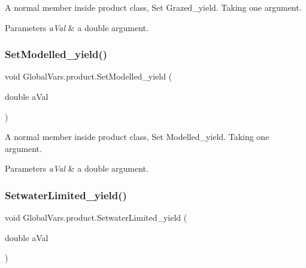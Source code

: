 A normal member inside product class, Set Grazed\+\_\+yield. Taking one argument. 


\begin{DoxyParams}{Parameters}
{\em a\+Val} & a double argument. \\
\hline
\end{DoxyParams}
\mbox{\label{class_global_vars_1_1product_a717c1a27b094cb7b905c6093c4006a2c}} 
\subsubsection{\texorpdfstring{SetModelled\_yield()}{SetModelled\_yield()}}
{\footnotesize\ttfamily void Global\+Vars.\+product.\+Set\+Modelled\+\_\+yield (\begin{DoxyParamCaption}\item[{double}]{a\+Val }\end{DoxyParamCaption})\hspace{0.3cm}{\ttfamily [inline]}}



A normal member inside product class, Set Modelled\+\_\+yield. Taking one argument. 


\begin{DoxyParams}{Parameters}
{\em a\+Val} & a double argument. \\
\hline
\end{DoxyParams}
\mbox{\label{class_global_vars_1_1product_ab53d704f6a5d1b59bc932fc5a405419c}} 
\subsubsection{\texorpdfstring{SetwaterLimited\_yield()}{SetwaterLimited\_yield()}}
{\footnotesize\ttfamily void Global\+Vars.\+product.\+Setwater\+Limited\+\_\+yield (\begin{DoxyParamCaption}\item[{double}]{a\+Val }\end{DoxyParamCaption})\hspace{0.3cm}{\ttfamily [inline]}}



